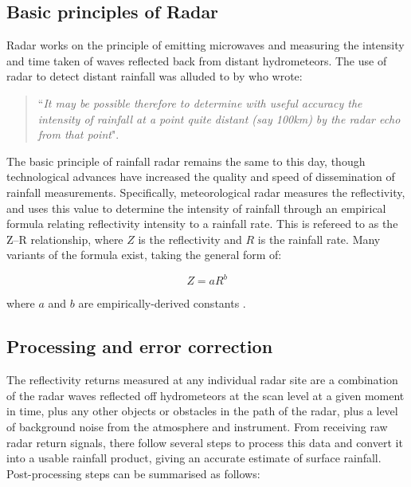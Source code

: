 \subsection{Basic principles of Radar}

Radar works on the principle of emitting microwaves and measuring the intensity and time taken of waves reflected back from distant hydrometeors. The use of radar to detect distant rainfall was alluded to by \citet{marshall1947measurement} who wrote: 

\begin{quotation} 
``\textit{It may be possible therefore to determine with useful accuracy the intensity of rainfall at a point quite distant (say 100km) by the radar echo from that point}".
\end{quotation}

The basic principle of rainfall radar remains the same to this day, though technological advances have increased the quality and speed of dissemination of rainfall measurements. Specifically, meteorological radar measures the reflectivity, and uses this value to determine the intensity of rainfall through an empirical formula relating reflectivity intensity to a rainfall rate. This is refereed to as the Z--R relationship, where \(Z\) is the reflectivity and \(R\) is the rainfall rate. Many variants of the formula exist, taking the general form of:
  
\begin{equation}
Z = aR^b
\end{equation}

\noindent
where \(a\) and \(b\) are empirically-derived constants \citep{gunn1949terminal,joss1969raindrop}.

\subsection{Processing and error correction}

The reflectivity returns measured at any individual radar site are a combination of the radar waves reflected off hydrometeors at the scan level at a given moment in time, plus any other objects or obstacles in the path of the radar, plus a level of background noise from the atmosphere and instrument. From receiving raw radar return signals, there follow several steps to process this data and convert it into a usable rainfall product, giving an accurate estimate of surface rainfall. Post-processing steps can be summarised as follows:

